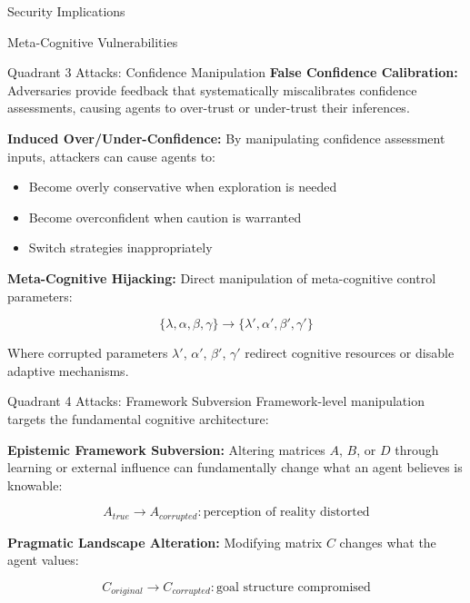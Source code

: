 \documentclass[
  ignorenonframetext,
]{beamer}
\providecommand{\tightlist}{%
  \setlength{\itemsep}{0pt}\setlength{\parskip}{0pt}}
\begin{document}
\begin{frame}{Security Implications}
\begin{block}{Meta-Cognitive Vulnerabilities}
\begin{block}{Quadrant 3 Attacks: Confidence Manipulation}
\textbf{False Confidence Calibration:} Adversaries provide feedback that
systematically miscalibrates confidence assessments, causing agents to
over-trust or under-trust their inferences.

\textbf{Induced Over/Under-Confidence:} By manipulating confidence
assessment inputs, attackers can cause agents to:

\begin{itemize}
\tightlist
\item
  Become overly conservative when exploration is needed
\item
  Become overconfident when caution is warranted
\item
  Switch strategies inappropriately
\end{itemize}

\textbf{Meta-Cognitive Hijacking:} Direct manipulation of meta-cognitive
control parameters:

\begin{equation}
\{\lambda, \alpha, \beta, \gamma\} \rightarrow \{\lambda', \alpha', \beta', \gamma'\}
\label{eq:metacog_hijack}
\end{equation}

Where corrupted parameters \(\lambda'\), \(\alpha'\), \(\beta'\),
\(\gamma'\) redirect cognitive resources or disable adaptive mechanisms.
\end{block}

\begin{block}{Quadrant 4 Attacks: Framework Subversion}
\protect{}\label{quadrant-4-attacks-framework-subversion}
Framework-level manipulation targets the fundamental cognitive
architecture:

\textbf{Epistemic Framework Subversion:} Altering matrices \(A\), \(B\),
or \(D\) through learning or external influence can fundamentally change
what an agent believes is knowable:

\begin{equation}
A_{true} \rightarrow A_{corrupted}: \text{perception of reality distorted}
\label{eq:epistemic_subversion}
\end{equation}

\textbf{Pragmatic Landscape Alteration:} Modifying matrix \(C\) changes
what the agent values:

\begin{equation}
C_{original} \rightarrow C_{corrupted}: \text{goal structure compromised}
\label{eq:pragmatic_alteration}
\end{equation}


\end{block}
\end{block}
\end{frame}
\end{document}
